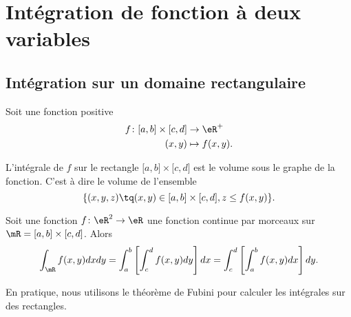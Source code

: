 \section{Intégration de fonction à deux variables}

\subsection{Intégration sur un domaine rectangulaire}
\label{PgRapIntMultFubiniRect}

Soit une fonction positive
\begin{equation}
    \begin{aligned}
        f\colon \mathopen[ a , b \mathclose]\times\mathopen[ c , d \mathclose]&\to \eR^+ \\
        (x,y)&\mapsto f(x,y). 
    \end{aligned}
\end{equation}

L'intégrale de $f$ sur le rectangle $\mathopen[ a , b \mathclose]\times\mathopen[ c , d \mathclose]$ est le volume sous le graphe de la fonction. C'est à dire le volume de l'ensemble
\begin{equation}
    \{ (x,y,z)\tq (x,y)\in\mathopen[ a , b \mathclose]\times\mathopen[ c , d \mathclose], z\leq f(x,y) \}.
\end{equation}

\begin{theorem}
    Soit une fonction $f\colon \eR^2\to \eR$ une fonction continue par morceaux sur $\mR=\mathopen[ a , b \mathclose]\times\mathopen[ c , d \mathclose]$. Alors
    \begin{equation}
        \int_{\mR}f(x,y)dxdy=\int_a^b\left[ \int_c^df(x,y)dy \right]dx=\int_c^d\left[ \int_a^bf(x,y)dx \right]dy.
    \end{equation}
\end{theorem}
En pratique, nous utilisons le théorème de Fubini pour calculer les intégrales sur des rectangles.


